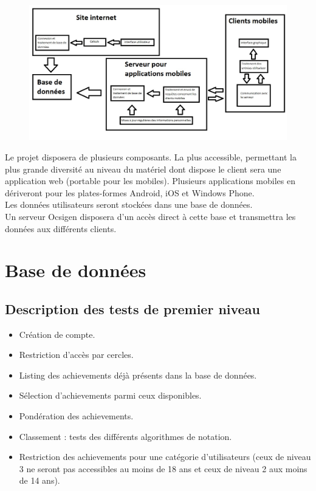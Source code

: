 \documentclass{life-fr}
\begin{document}
\begin{figure}[H]
  \begin{center}
    \includegraphics[width=11.5cm]{img/couches_application.png}
  \end{center}
\end{figure}

Le projet disposera de plusieurs composants.
La plus accessible, permettant la plus grande diversité au niveau du matériel dont dispose le client sera une application web (portable pour les mobiles).
Plusieurs applications mobiles en dériveront pour les plates-formes Android, iOS et Windows Phone.
\\
Les données utilisateurs seront stockées dans une base de données.
\\
Un serveur Ocsigen disposera d’un accès direct à cette base et transmettra les données aux différents clients.


\chapter{Base de données}

\section{Description des tests de premier niveau}

\begin{itemize}
  \item Création de compte.
  \item Restriction d’accès par cercles.
  \item Listing des achievements déjà présents dans la base de données.
  \item Sélection d’achievements parmi ceux disponibles.
  \item Pondération des achievements.
  \item Classement : tests des différents algorithmes de notation.
  \item Restriction des achievements pour une catégorie d’utilisateurs (ceux de niveau 3 ne seront pas accessibles au moins de 18 ans et ceux de niveau 2 aux moins de 14 ans).
\end{itemize}
\end{document}
